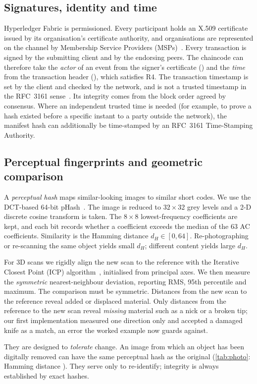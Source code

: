 \subsection{Signatures, identity and time}
Hyperledger Fabric is permissioned. Every participant holds an X.509 certificate issued by its organisation's certificate authority, and organisations are represented on the channel by Membership Service Providers (MSPs)~\cite{androulaki2018}. Every transaction is signed by the submitting client and by the endorsing peers. The chaincode can therefore take the \emph{actor} of an event from the signer's certificate () and the \emph{time} from the transaction header (), which satisfies R4. The transaction timestamp is set by the client and checked by the network, and is not a trusted timestamp in the RFC~3161 sense~\cite{rfc3161}. Its integrity comes from the block order agreed by consensus. Where an independent trusted time is needed (for example, to prove a hash existed before a specific instant to a party outside the network), the manifest hash can additionally be time-stamped by an RFC~3161 Time-Stamping Authority.

\subsection{Perceptual fingerprints and geometric comparison}
\label{sec:perceptual}
A \emph{perceptual hash} maps similar-looking images to similar short codes. We use the DCT-based 64-bit pHash~\cite{zauner2010}. The image is reduced to $32\times32$ grey levels and a 2-D discrete cosine transform is taken. The $8\times8$ lowest-frequency coefficients are kept, and each bit records whether a coefficient exceeds the median of the 63 AC coefficients. Similarity is the Hamming distance $d_H \in [0,64]$. Re-photographing or re-scanning the same object yields small $d_H$; different content yields large $d_H$.

For 3D scans we rigidly align the new scan to the reference with the Iterative Closest Point (ICP) algorithm~\cite{besl1992}, initialised from principal axes. We then measure the \emph{symmetric} nearest-neighbour deviation, reporting RMS, 95th percentile and maximum. The comparison must be symmetric. Distances from the new scan to the reference reveal added or displaced material. Only distances from the reference to the new scan reveal \emph{missing} material such as a nick or a broken tip; our first implementation measured one direction only and accepted a damaged knife as a match, an error the worked example now guards against.

\begin{caution}
They are designed to \emph{tolerate} change. An image from which an object has been digitally removed can have the same perceptual hash as the original (\cref{tab:photo}: Hamming distance \PhotoTamperDist{}). They serve only to re-identify; integrity is always established by exact hashes.
\end{caution}
